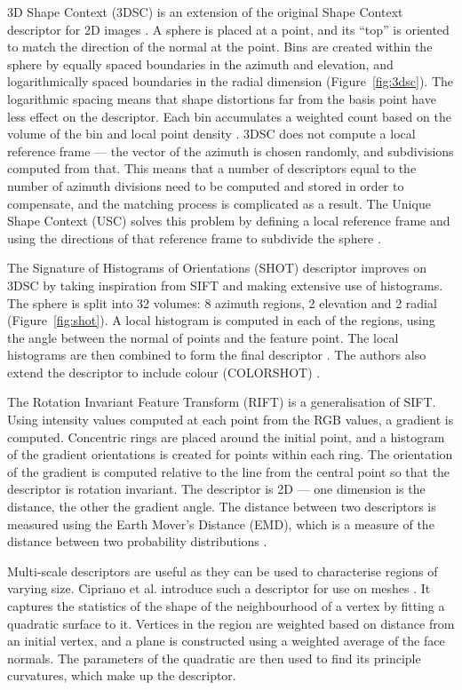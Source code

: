 \documentclass[11pt,a4paper]{kth-mag}
\begin{document}
3D Shape Context (3DSC) is an extension of the original Shape Context descriptor
for 2D images \cite{belongie2002shape}. A sphere is placed at a point, and its
``top'' is oriented to match the direction of the normal at the point. Bins are
created within the sphere by equally spaced boundaries in the azimuth and
elevation, and logarithmically spaced boundaries in the radial dimension (Figure~\ref{fig:3dsc}). The
logarithmic spacing means that shape distortions far from the basis point have
less effect on the descriptor. Each bin accumulates a weighted count based on
the volume of the bin and local point density \cite{frome2004recognizing}. 3DSC
does not compute a local reference frame --- the vector of the azimuth is chosen
randomly, and subdivisions computed from that. This means that a number of
descriptors equal to the number of azimuth divisions need to be computed and
stored in order to compensate, and the matching process is complicated as a
result. The Unique Shape Context (USC) solves this problem by defining a local
reference frame and using the directions of that reference frame to subdivide
the sphere \cite{tombari2010uniquesc}.

The Signature of Histograms of Orientations (SHOT) descriptor improves on 3DSC
by taking inspiration from SIFT and making extensive use of histograms. The
sphere is split into 32 volumes: 8 azimuth regions, 2 elevation and 2 radial
(Figure~\ref{fig:shot}). A local histogram is computed in each of the regions,
using the angle between the normal of points and the feature point. The local
histograms are then combined to form the final descriptor
\cite{tombari2010unique}. The authors also extend the descriptor to include
colour (COLORSHOT) \cite{tombari2011combined}.

The Rotation Invariant Feature Transform (RIFT) is a generalisation of SIFT. Using
intensity values computed at each point from the RGB values, a gradient is
computed. Concentric rings are placed around the initial point, and a histogram
of the gradient orientations is created for points within each ring. The
orientation of the gradient is computed relative to the line from the central
point so that the descriptor is rotation invariant. The descriptor is 2D --- one
dimension is the distance, the other the gradient angle. The distance between
two descriptors is measured using the Earth Mover's Distance (EMD), which is a
measure of the distance between two probability distributions
\cite{lazebnik2005sparse}.

Multi-scale descriptors are useful as they can be used to characterise regions
of varying size. Cipriano et al. introduce such a descriptor for use on meshes
\cite{cipriano2009multi}. It captures the statistics of the shape of the
neighbourhood of a vertex by fitting a quadratic surface to it. Vertices in the
region are weighted based on distance from an initial vertex, and a plane is
constructed using a weighted average of the face normals. The parameters of the
quadratic are then used to find its principle curvatures, which make up the
descriptor.
\end{document}
